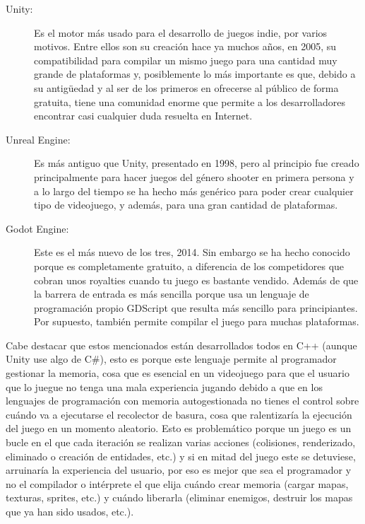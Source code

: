 \begin{description}
	\item[Unity:] Es el motor más usado para el desarrollo de juegos indie, por varios motivos. Entre ellos son su creación hace ya muchos años, en 2005, su compatibilidad para compilar un mismo juego para una cantidad muy grande de plataformas y, posiblemente lo más importante es que, debido a su antigüedad y al ser de los primeros en ofrecerse al público de forma gratuita, tiene una comunidad enorme que permite a los desarrolladores encontrar casi cualquier duda resuelta en Internet.
	\item[Unreal Engine:]  Es más antiguo que Unity, presentado en 1998, pero al principio fue creado principalmente para hacer juegos del género shooter en primera persona y a lo largo del tiempo se ha hecho más genérico para poder crear cualquier tipo de videojuego, y además, para una gran cantidad de plataformas. 
	\item[Godot Engine:] Este es el más nuevo de los tres, 2014. Sin embargo se ha hecho conocido porque es completamente gratuito, a diferencia de los competidores que cobran unos royalties cuando tu juego es bastante vendido. Además de que la barrera de entrada es más sencilla porque usa un lenguaje de programación propio GDScript que resulta más sencillo para principiantes. Por supuesto, también permite compilar el juego para muchas plataformas.
\end{description}

Cabe destacar que estos mencionados están desarrollados todos en C++ (aunque Unity use algo de C\#), esto es porque este lenguaje permite al programador gestionar la memoria, cosa que es esencial en un videojuego para que el usuario que lo juegue no tenga una mala experiencia jugando debido a que en los lenguajes de programación con memoria autogestionada no tienes el control sobre cuándo va a ejecutarse el recolector de basura, cosa que ralentizaría la ejecución del juego en un momento aleatorio. Esto es problemático porque un juego es un bucle en el que cada iteración se realizan varias acciones (colisiones, renderizado, eliminado o creación de entidades, etc.) y si en mitad del juego este se detuviese, arruinaría la experiencia del usuario, por eso es mejor que sea el programador y no el compilador o intérprete el que elija cuándo crear memoria (cargar mapas, texturas, sprites, etc.) y cuándo liberarla (eliminar enemigos, destruir los mapas que ya han sido usados, etc.).

